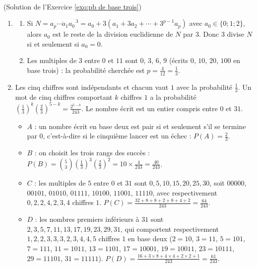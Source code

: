 \begin{corrige}
\begin{sol} ~ \\
(Solution de l'Exercice \ref{exo:pb de base trois})
\begin{enumerate}
\item \begin{enumerate}
      \item Si $N = \overline{a_p \cdots a_1 a_0}^{\,3} = a_0 + 3\left( a_1 + 3a_2 + \cdots + 3^{p-1}a_p \right)$ avec
            $a_0 \in \{0 ; 1 ; 2\}$, alors $a_0$ est le reste de la division euclidienne de $N$ par $3$.
            Donc $3$ divise $N$ si et seulement si $a_0 = 0$.
      \item Les multiples de $3$ entre $0$ et $11$ sont $0$, $3$, $6$, $9$ (\'ecrits $0$, $10$, $20$, $100$ en base trois) :
            la probabilit\'e cherch\'ee est $\boxed{p = \frac{4}{12} = \frac{1}{3}}$.
      \end{enumerate}
\item Les cinq chiffres sont ind\'ependants et chacun vaut $1$ avec la probabilit\'e $\frac{1}{3}$. Un mot de cinq chiffres
      comportant $k$ chiffres $1$ a la probabilit\'e $\left(\frac{1}{3}\right)^k \left(\frac{2}{3}\right)^{5-k} = \frac{2^{5-k}}{243}$.
      Le nombre \'ecrit est un entier compris entre $0$ et $31$.
      \begin{itemize}
      \item $A$ : un nombre \'ecrit en base deux est pair si et seulement s'il se termine par $0$, c'est-\`a-dire si le
            cinqui\`eme lancer est un \'echec : $\boxed{P(A) = \frac{2}{3}}$.
      \item $B$ : on choisit les trois rangs des succ\`es : $P(B) = \binom{5}{3}\left(\frac{1}{3}\right)^3\left(\frac{2}{3}\right)^2
            = 10 \times \frac{4}{243} = \boxed{\frac{40}{243}}$.
      \item $C$ : les multiples de $5$ entre $0$ et $31$ sont $0, 5, 10, 15, 20, 25, 30$, soit
            $00000$, $00101$, $01010$, $01111$, $10100$, $11001$, $11110$, avec respectivement $0, 2, 2, 4, 2, 3, 4$ chiffres $1$.
            $P(C) = \frac{32 + 8 + 8 + 2 + 8 + 4 + 2}{243} = \boxed{\frac{64}{243}}$.
      \item $D$ : les nombres premiers inf\'erieurs \`a $31$ sont $2, 3, 5, 7, 11, 13, 17, 19, 23, 29, 31$, qui comportent
            respectivement $1, 2, 2, 3, 3, 3, 2, 3, 4, 4, 5$ chiffres $1$ en base deux
            ($2 = 10$, $3 = 11$, $5 = 101$, $7 = 111$, $11 = 1011$, $13 = 1101$, $17 = 10001$, $19 = 10011$,
            $23 = 10111$, $29 = 11101$, $31 = 11111$).
            $P(D) = \frac{16 + 3 \times 8 + 4 \times 4 + 2 \times 2 + 1}{243} = \boxed{\frac{61}{243}}$.
      \end{itemize}
\end{enumerate}
\end{sol}


\end{corrige}
